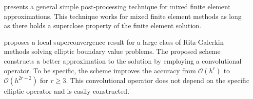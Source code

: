 \cite{bramble1989local} presents a general simple post-processing technique for mixed finite element approximations. This technique works for mixed finite element methods as long as there holds a superclose property of the finite element solution.

\cite{bramble1977higher} proposes a local superconvergence result for a large class of Ritz-Galerkin methods solving elliptic boundary value problems. The proposed scheme constructs a better approximation to the solution by employing a convolutional operator. To be specific, the scheme improves the accuracy from $\mathcal{O}(h^r)$ to $\mathcal{O}(h^{2r-2})$ for $r\ge 3$. This convolutional operator does not depend on the specific elliptic operator and is easily constructed.